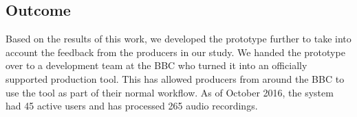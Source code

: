 













\subsection{Outcome}
Based on the results of this work, we developed the prototype further to take into account the feedback from the
producers in our study.  We handed the prototype over to a development team at the BBC who turned it into an
officially supported production tool.  This has allowed producers from around the BBC to use the tool as part of their
normal workflow.  As of October 2016, the system had 45 active users and has processed 265 audio recordings.

